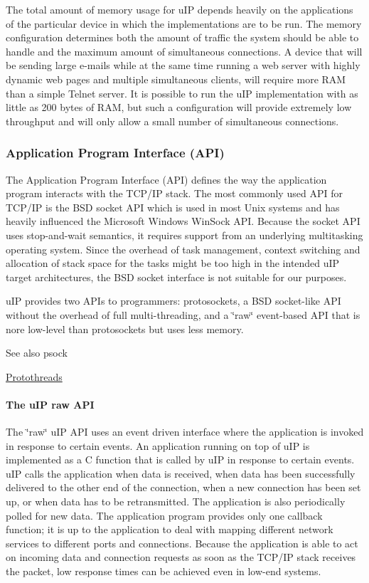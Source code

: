 The total amount of memory usage for u\+IP depends heavily on the applications of the particular device in which the implementations are to be run. The memory configuration determines both the amount of traffic the system should be able to handle and the maximum amount of simultaneous connections. A device that will be sending large e-\/mails while at the same time running a web server with highly dynamic web pages and multiple simultaneous clients, will require more R\+AM than a simple Telnet server. It is possible to run the u\+IP implementation with as little as 200 bytes of R\+AM, but such a configuration will provide extremely low throughput and will only allow a small number of simultaneous connections.\hypertarget{a00074_api}{}\subsubsection{Application Program Interface (\+A\+P\+I)}\label{a00074_api}
The Application Program Interface (A\+PI) defines the way the application program interacts with the T\+C\+P/\+IP stack. The most commonly used A\+PI for T\+C\+P/\+IP is the B\+SD socket A\+PI which is used in most Unix systems and has heavily influenced the Microsoft Windows Win\+Sock A\+PI. Because the socket A\+PI uses stop-\/and-\/wait semantics, it requires support from an underlying multitasking operating system. Since the overhead of task management, context switching and allocation of stack space for the tasks might be too high in the intended u\+IP target architectures, the B\+SD socket interface is not suitable for our purposes.

u\+IP provides two A\+P\+Is to programmers\+: protosockets, a B\+SD socket-\/like A\+PI without the overhead of full multi-\/threading, and a \char`\"{}raw\char`\"{} event-\/based A\+PI that is nore low-\/level than protosockets but uses less memory.

\begin{DoxySeeAlso}{See also}
psock 

\hyperlink{a00066}{Protothreads}
\end{DoxySeeAlso}
\hypertarget{a00074_rawapi}{}\paragraph{The u\+I\+P raw A\+PI}\label{a00074_rawapi}
The \char`\"{}raw\char`\"{} u\+IP A\+PI uses an event driven interface where the application is invoked in response to certain events. An application running on top of u\+IP is implemented as a C function that is called by u\+IP in response to certain events. u\+IP calls the application when data is received, when data has been successfully delivered to the other end of the connection, when a new connection has been set up, or when data has to be retransmitted. The application is also periodically polled for new data. The application program provides only one callback function; it is up to the application to deal with mapping different network services to different ports and connections. Because the application is able to act on incoming data and connection requests as soon as the T\+C\+P/\+IP stack receives the packet, low response times can be achieved even in low-\/end systems.

